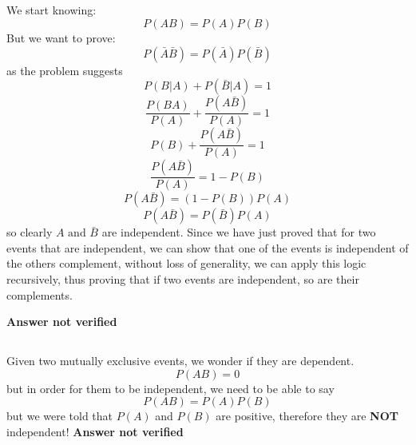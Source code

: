 \subsection{}
We start knowing:
\begin{equation}
	P(AB) = P(A)P(B)
\end{equation}
But we want to prove:
\begin{equation}
	P(\bar{A}\bar{B}) = P(\bar{A})P(\bar{B})
\end{equation}
as the problem suggests
\begin{equation}
	P(B|A) + P(\bar{B}|A) = 1
\end{equation}
\begin{equation}
	\frac{P(BA)}{P(A)} + \frac{P(A\bar{B})}{P(A)} = 1
\end{equation}
\begin{equation}
	P(B) + \frac{P(A\bar{B})}{P(A)} = 1
\end{equation}
\begin{equation}
	\frac{P(A\bar{B})}{P(A)} = 1 - P(B)
\end{equation}
\begin{equation}
	P(A\bar{B}) = \left(1 - P(B)\right)P(A)
\end{equation}
\begin{equation}
	P(A\bar{B}) = P(\bar{B})P(A)
\end{equation}
so clearly $A \text{ and } \bar{B}$ are independent.  Since we have just proved that for two events that are independent, we can show that one of the events is independent of the others complement, without loss of generality, we can apply this logic recursively, thus proving that if two events are independent, so are their complements.

\textbf{Answer not verified}

\subsection{}
Given two mutually exclusive events, we wonder if they are dependent.  
\begin{equation}
	P(AB) = 0
\end{equation}
but in order for them to be independent, we need to be able to say
\begin{equation}
	P(AB) = P(A)P(B)
\end{equation}
but we were told that $P(A)$ and $P(B)$ are positive, therefore they are \textbf{NOT} independent!
\textbf{Answer not verified}

